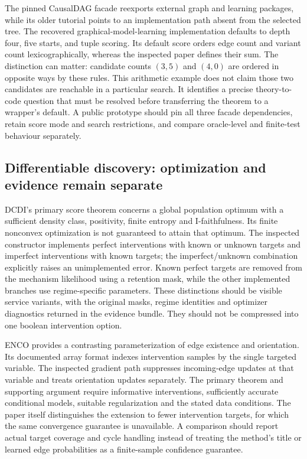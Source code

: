 The pinned CausalDAG facade reexports external graph and learning packages,
while its older tutorial points to an implementation path absent from the
selected tree. The recovered graphical-model-learning implementation
defaults to depth four, five starts, and tuple scoring. Its default score
orders edge count and variant count lexicographically, whereas the
inspected paper defines their sum. The distinction can matter: candidate
counts $(3,5)$ and $(4,0)$ are ordered in opposite ways by these rules.
This arithmetic example does not claim those two candidates are reachable
in a particular search. It identifies a precise theory-to-code question
that must be resolved before transferring the theorem to a wrapper's
default. A public prototype should pin all three facade dependencies,
retain score mode and search restrictions, and compare oracle-level and
finite-test behaviour separately.\citep{exec14_pt_causaldag,exec14_pt_gml,
exec14_pt_paper_utigsp,exec14_pt_exact}

\subsection{Differentiable discovery: optimization and evidence remain separate}

DCDI's primary score theorem concerns a global population optimum with a
sufficient density class, positivity, finite entropy and I-faithfulness.
Its finite nonconvex optimization is not guaranteed to attain that optimum.
The inspected constructor implements perfect interventions with known or
unknown targets and imperfect interventions with known targets; the
imperfect/unknown combination explicitly raises an unimplemented error.
Known perfect targets are removed from the mechanism likelihood using a
retention mask, while the other implemented branches use regime-specific
parameters. These distinctions should be visible service variants, with
the original masks, regime identities and optimizer diagnostics returned
in the evidence bundle. They should not be compressed into one boolean
intervention option.\citep{exec14_pt_paper_dcdi,exec14_pt_dcdi}

ENCO provides a contrasting parameterization of edge existence and
orientation. Its documented array format indexes intervention samples by
the single targeted variable. The inspected gradient path suppresses
incoming-edge updates at that variable and treats orientation updates
separately. The primary theorem and supporting argument require informative
interventions, sufficiently accurate conditional models, suitable
regularization and the stated data conditions. The paper itself distinguishes
the extension to fewer intervention targets, for which the same convergence
guarantee is unavailable. A comparison should report actual target coverage
and cycle handling instead of treating the method's title or learned edge
probabilities as a finite-sample confidence guarantee.
\citep{exec14_pt_enco,exec14_pt_paper_enco}

